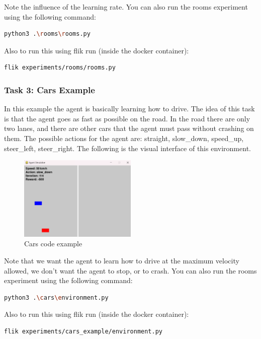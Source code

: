 Note the influence of the learning rate. You can also run the rooms experiment using the following command:

\begin{lstlisting}[language=bash]
python3 .\rooms\rooms.py
\end{lstlisting}

Also to run this using flik run (inside the docker container):

\begin{lstlisting}[language=bash]
flik experiments/rooms/rooms.py
\end{lstlisting}

\subsubsection{Task 3: Cars Example}

In this example the agent is basically learning how to drive. The idea of this task is that the agent goes as fast as possible on the road. In the road there are only two lanes, and there are other cars that the agent must pass without crashing on them. The possible actions for the agent are: straight, slow\_down, speed\_up, steer\_left, steer\_right. The following is the visual interface of this environment.

\begin{figure}[h]
    \centering
    \includegraphics[width=0.5\textwidth]{figures/cars_example.png}
    \caption{Cars code example}
    \label{fig:cars-code-example}
\end{figure}

Note that we want the agent to learn how to drive at the maximum velocity allowed, we don’t want the agent to stop, or to crash. You can also run the rooms experiment using the following command:

\begin{lstlisting}[language=bash]
python3 .\cars\environment.py
\end{lstlisting}

Also to run this using flik run (inside the docker container):

\begin{lstlisting}[language=bash]
flik experiments/cars_example/environment.py
\end{lstlisting}



\endinput

